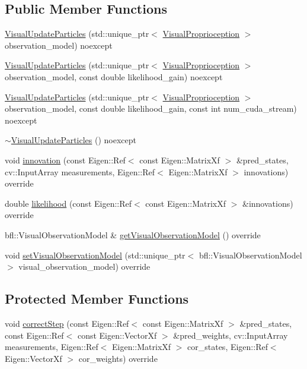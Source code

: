 \subsection*{Public Member Functions}
\begin{DoxyCompactItemize}
\item 
\hyperlink{classVisualUpdateParticles_aa67179b62e91f386402d176975151d48}{Visual\+Update\+Particles} (std\+::unique\+\_\+ptr$<$ \hyperlink{classVisualProprioception}{Visual\+Proprioception} $>$ observation\+\_\+model) noexcept
\item 
\hyperlink{classVisualUpdateParticles_ade399f29a375d20c3c707dbab2fb23bb}{Visual\+Update\+Particles} (std\+::unique\+\_\+ptr$<$ \hyperlink{classVisualProprioception}{Visual\+Proprioception} $>$ observation\+\_\+model, const double likelihood\+\_\+gain) noexcept
\item 
\hyperlink{classVisualUpdateParticles_a225e07a8873f4ed372b3b12ee4a0f044}{Visual\+Update\+Particles} (std\+::unique\+\_\+ptr$<$ \hyperlink{classVisualProprioception}{Visual\+Proprioception} $>$ observation\+\_\+model, const double likelihood\+\_\+gain, const int num\+\_\+cuda\+\_\+stream) noexcept
\item 
\hyperlink{classVisualUpdateParticles_a96097675396400a8f6932e4c867d9f30}{$\sim$\+Visual\+Update\+Particles} () noexcept
\item 
void \hyperlink{classVisualUpdateParticles_ac6f27c465111a248314ce93ed630dd75}{innovation} (const Eigen\+::\+Ref$<$ const Eigen\+::\+Matrix\+Xf $>$ \&pred\+\_\+states, cv\+::\+Input\+Array measurements, Eigen\+::\+Ref$<$ Eigen\+::\+Matrix\+Xf $>$ innovations) override
\item 
double \hyperlink{classVisualUpdateParticles_ac8905544d7c082cca2fe52b773023bd7}{likelihood} (const Eigen\+::\+Ref$<$ const Eigen\+::\+Matrix\+Xf $>$ \&innovations) override
\item 
bfl\+::\+Visual\+Observation\+Model \& \hyperlink{classVisualUpdateParticles_a34f3b5665eff632890713db818d1995a}{get\+Visual\+Observation\+Model} () override
\item 
void \hyperlink{classVisualUpdateParticles_adced067cb277d138db7f452db1bc01a6}{set\+Visual\+Observation\+Model} (std\+::unique\+\_\+ptr$<$ bfl\+::\+Visual\+Observation\+Model $>$ visual\+\_\+observation\+\_\+model) override
\end{DoxyCompactItemize}
\subsection*{Protected Member Functions}
\begin{DoxyCompactItemize}
\item 
void \hyperlink{classVisualUpdateParticles_ac0ed3c0a2ccab6cbc65a5f83fa834483}{correct\+Step} (const Eigen\+::\+Ref$<$ const Eigen\+::\+Matrix\+Xf $>$ \&pred\+\_\+states, const Eigen\+::\+Ref$<$ const Eigen\+::\+Vector\+Xf $>$ \&pred\+\_\+weights, cv\+::\+Input\+Array measurements, Eigen\+::\+Ref$<$ Eigen\+::\+Matrix\+Xf $>$ cor\+\_\+states, Eigen\+::\+Ref$<$ Eigen\+::\+Vector\+Xf $>$ cor\+\_\+weights) override
\end{DoxyCompactItemize}
